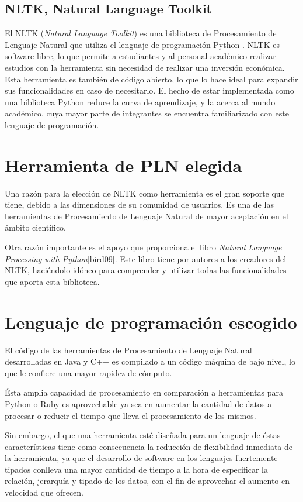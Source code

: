 \subsection{NLTK, Natural Language Toolkit}

El NLTK (\textit{Natural Language Toolkit}) es una biblioteca de Procesamiento de Lenguaje Natural que utiliza el lenguaje de programación Python \cite{bird09}.
%
NLTK es software libre, lo que permite a estudiantes y al personal académico realizar estudios con la herramienta sin necesidad de realizar una inversión económica.
%
Esta herramienta es también de código abierto, lo que lo hace ideal para expandir sus funcionalidades en caso de necesitarlo.
%
El hecho de estar implementada como una biblioteca Python reduce la curva de aprendizaje, y la acerca al mundo académico, cuya mayor parte de integrantes se encuentra familiarizado con este lenguaje de programación.

\label{chosen-nlp-tool}
\section{Herramienta de PLN elegida}

Una razón para la elección de NLTK como herramienta es el gran soporte que tiene, debido a las dimensiones de su comunidad de usuarios. Es una de las herramientas de Procesamiento de Lenguaje Natural de mayor aceptación en el ámbito científico.

Otra razón importante es el apoyo que proporciona el libro \textit{Natural Language Processing with Python}\ref{bird09}. Este libro tiene por autores a los creadores del NLTK, haciéndolo idóneo para comprender y utilizar todas las funcionalidades que aporta esta biblioteca.

\section{Lenguaje de programación escogido}

El código de las herramientas de Procesamiento de Lenguaje Natural desarrolladas en Java y C++ es compilado a un código máquina de bajo nivel, lo que le confiere una mayor rapidez de cómputo.

Ésta amplia capacidad de procesamiento en comparación a herramientas para Python o Ruby es aprovechable ya sea en aumentar la cantidad de datos a procesar o reducir el tiempo que lleva el procesamiento de los mismos.

Sin embargo, el que una herramienta esté diseñada para un lenguaje de éstas características tiene como consecuencia la reducción de flexibilidad inmediata de la herramienta, ya que el desarrollo de software en los lenguajes fuertemente tipados conlleva una mayor cantidad de tiempo a la hora de especificar la relación, jerarquía y tipado de los datos, con el fin de aprovechar el aumento en velocidad que ofrecen.

